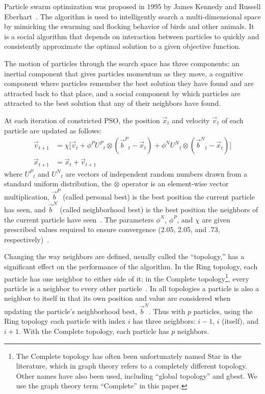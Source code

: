 \documentclass[ms]{byuprop}
\providecommand{\pers}{\ensuremath{P}}
\providecommand{\neigh}{\ensuremath{N}}
\providecommand{\nURand}{\ensuremath{U^\neigh}}
\providecommand{\pURand}{\ensuremath{U^\pers}}
\providecommand{\ppos}{\ensuremath{\Vec{x}}}
\providecommand{\pvel}{\ensuremath{\Vec{v}}}
\providecommand{\nbest}{\ensuremath{\Vec{b}^\neigh}}
\providecommand{\pbest}{\ensuremath{\Vec{b}^\pers}}
\providecommand{\constriction}{\ensuremath{\chi}}
\providecommand{\ncoeff}{\ensuremath{\phi^\neigh}}
\providecommand{\pcoeff}{\ensuremath{\phi^\pers}}
\begin{document}
Particle swarm optimization was proposed in 1995 by James Kennedy and Russell
Eberhart~\citep{kennedy-1995-particle-swarm-optimization}.  The algorithm is
used to intelligently search a multi-dimensional space by mimicking the
swarming and flocking behavior of birds and other animals. It is a social
algorithm that depends on interaction between particles to quickly and
consistently approximate the optimal solution to a given objective function.

The motion of particles through the search space has three components: an
inertial component that gives particles momentum as they move, a cognitive
component where particles remember the best solution they have found and are
attracted back to that place, and a social component by which particles are
attracted to the best solution that any of their neighbors have found.

At each iteration of constricted PSO, the position $\ppos_t$ and velocity
$\pvel_t$ of each particle are updated as follows:
\begin{align}
\label{eq:velupdate}
	\pvel_{t+1} &=
		\constriction \bigl[ \pvel_t
			+ \pcoeff\pURand_{t}\otimes(\pbest_{t} - \ppos_{t}) +
			\ncoeff\nURand_{t}\otimes(\nbest_{t} - \ppos_{t})
		\bigr] \\
\label{eq:posupdate}
	\ppos_{t+1} &= \ppos_{t} + \pvel_{t+1}
\end{align}
where \( \pURand_{t} \) and \( \nURand_{t} \) are vectors of independent random
numbers drawn from a standard uniform distribution, the \( \otimes \) operator
is an element-wise vector multiplication, $\pbest$ (called personal best) is
the best position the current particle has seen, and $\nbest$ (called
neighborhood best) is the best position the neighbors of the current particle
have seen~\citep{bratton-2007-defining-a-standard-for-pso}.  The parameters \(
\ncoeff \), \( \pcoeff \), and \( \constriction \) are given prescribed values
required to ensure convergence (2.05, 2.05, and .73,
respectively)~\citep{clerc-2002-constricted-pso}. 

Changing the way neighbors are defined, usually called the ``topology,'' has a
significant effect on the performance of the algorithm.  In the Ring topology,
each particle has one neighbor to either side of it; in the Complete
topology\footnote{The Complete topology has often been unfortunately named Star
in the literature, which in graph theory refers to a completely different
topology.  Other names have also been used, including ``global topology'' and
gbest.  We use the graph theory term ``Complete'' in this paper.}, every
particle is a neighbor to every other
particle~\citep{bratton-2007-defining-a-standard-for-pso}.  In all topologies a
particle is also a neighbor to itself in that its own position and value are
considered when updating the particle's neighborhood best, $\nbest$.  Thus with
$p$ particles, using the Ring topology each particle with index $i$ has three
neighbors: $i-1$, $i$ (itself), and $i+1$.  With the Complete topology, each
particle has $p$ neighbors.
\end{document}
